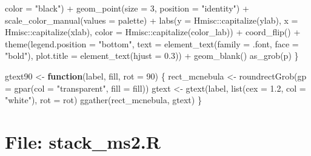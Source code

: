 \documentclass[
]{article}
\newenvironment{Shaded}{\begin{snugshade}}{\end{snugshade}}
\newcommand{\AttributeTok}[1]{\textcolor[rgb]{0.77,0.63,0.00}{#1}}
\newcommand{\ControlFlowTok}[1]{\textcolor[rgb]{0.13,0.29,0.53}{\textbf{#1}}}
\newcommand{\DecValTok}[1]{\textcolor[rgb]{0.00,0.00,0.81}{#1}}
\newcommand{\FloatTok}[1]{\textcolor[rgb]{0.00,0.00,0.81}{#1}}
\newcommand{\FunctionTok}[1]{\textcolor[rgb]{0.00,0.00,0.00}{#1}}
\newcommand{\NormalTok}[1]{#1}
\newcommand{\OtherTok}[1]{\textcolor[rgb]{0.56,0.35,0.01}{#1}}
\newcommand{\SpecialCharTok}[1]{\textcolor[rgb]{0.00,0.00,0.00}{#1}}
\newcommand{\StringTok}[1]{\textcolor[rgb]{0.31,0.60,0.02}{#1}}
\begin{document}
\begin{Shaded}
\begin{Highlighting}[]
        \AttributeTok{color =} \StringTok{"black"}\NormalTok{) }\SpecialCharTok{+}
      \FunctionTok{geom\_point}\NormalTok{(}\AttributeTok{size =} \DecValTok{3}\NormalTok{, }\AttributeTok{position =} \StringTok{"identity"}\NormalTok{) }\SpecialCharTok{+}
      \FunctionTok{scale\_color\_manual}\NormalTok{(}\AttributeTok{values =}\NormalTok{ palette) }\SpecialCharTok{+}
      \FunctionTok{labs}\NormalTok{(}\AttributeTok{y =}\NormalTok{ Hmisc}\SpecialCharTok{::}\FunctionTok{capitalize}\NormalTok{(ylab),}
        \AttributeTok{x =}\NormalTok{ Hmisc}\SpecialCharTok{::}\FunctionTok{capitalize}\NormalTok{(xlab),}
        \AttributeTok{color =}\NormalTok{ Hmisc}\SpecialCharTok{::}\FunctionTok{capitalize}\NormalTok{(color\_lab)) }\SpecialCharTok{+}
      \FunctionTok{coord\_flip}\NormalTok{() }\SpecialCharTok{+}
      \FunctionTok{theme}\NormalTok{(}\AttributeTok{legend.position =} \StringTok{"bottom"}\NormalTok{,}
        \AttributeTok{text =} \FunctionTok{element\_text}\NormalTok{(}\AttributeTok{family =}\NormalTok{ .font, }\AttributeTok{face =} \StringTok{"bold"}\NormalTok{),}
        \AttributeTok{plot.title =} \FunctionTok{element\_text}\NormalTok{(}\AttributeTok{hjust =} \FloatTok{0.3}\NormalTok{)) }\SpecialCharTok{+} 
      \FunctionTok{geom\_blank}\NormalTok{()}
    \FunctionTok{as\_grob}\NormalTok{(p)}
\NormalTok{  \}}

\NormalTok{gtext90 }\OtherTok{\textless{}{-}} \ControlFlowTok{function}\NormalTok{(label, fill, }\AttributeTok{rot =} \DecValTok{90}\NormalTok{) \{}
\NormalTok{  rect\_mcnebula }\OtherTok{\textless{}{-}} \FunctionTok{roundrectGrob}\NormalTok{(}\AttributeTok{gp =} \FunctionTok{gpar}\NormalTok{(}\AttributeTok{col =} \StringTok{"transparent"}\NormalTok{, }\AttributeTok{fill =}\NormalTok{ fill))}
\NormalTok{  gtext }\OtherTok{\textless{}{-}} \FunctionTok{gtext}\NormalTok{(label, }\FunctionTok{list}\NormalTok{(}\AttributeTok{cex =} \FloatTok{1.2}\NormalTok{, }\AttributeTok{col =} \StringTok{"white"}\NormalTok{), }\AttributeTok{rot =}\NormalTok{ rot)}
  \FunctionTok{ggather}\NormalTok{(rect\_mcnebula, gtext)}
\NormalTok{\}}
\end{Highlighting}
\end{Shaded}

\hypertarget{file-stack_ms2.r}{%
\section{File: stack\_ms2.R}\label{file-stack_ms2.r}}
\end{document}

